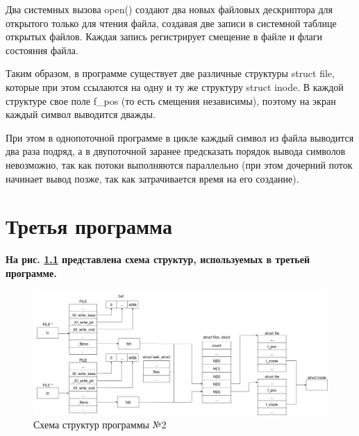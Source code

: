 \documentclass[12pt]{report}
\begin{document}
Два системных вызова open() создают два новых файловых дескриптора для открытого только для чтения файла, создавая две записи в системной таблице открытых файлов. Каждая запись регистрирует смещение в файле и флаги состояния файла. 

Таким образом, в программе существует две различные структуры struct file, которые при этом ссылаются на одну и ту же структуру struct inode. В каждой структуре свое поле f\_pos (то есть смещения независимы), поэтому на экран каждый символ выводится дважды.

При этом в однопоточной программе в цикле каждый символ из файла выводится два раза подряд, а в двупоточной заранее предсказать порядок вывода символов невозможно, так как потоки выполняются параллельно (при этом дочерний поток начинает вывод позже, так как затрачивается время на его создание).






\chapter{Третья программа}

\textbf{На рис. \ref{fig:prog_03_schema} представлена схема структур, используемых в третьей программе.}

\begin{figure}[H]
	\centering
	\includegraphics[scale=0.32]{img/prog_03_schema.jpg}
	\caption{Схема структур программы №2}
	\label{fig:prog_03_schema}
\end{figure}
\end{document}
